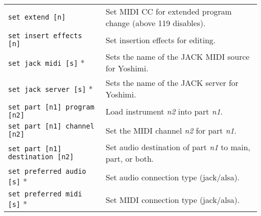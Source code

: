 \begin{table}[H]
\begin{tabular}{l l}
         \texttt{set extend [n]} &
            Set MIDI CC for extended program change (above 119 disables). \\

         \texttt{set insert effects [n]} &
            Set insertion effects for editing. \\

         \texttt{set jack midi [s]} * &
            Sets the name of the JACK MIDI source for Yoshimi. \\

         \texttt{set jack server [s]} * &
            Sets the name of the JACK server for Yoshimi. \\

         \texttt{set part [n1] program [n2]} &
            Load instrument \textsl{n2} into part \textsl{n1}. \\

         \texttt{set part [n1] channel [n2]} &
            Set the MIDI channel \textsl{n2} for part \textsl{n1}. \\

         \texttt{set part [n1] destination [n2]} &
            Set audio destination of part \textsl{n1}
            to main, part, or both. \\

         \texttt{set preferred audio [s]} * &
            Set audio connection type (jack/alsa). \\

         \texttt{set preferred midi [s]} * &
            Set MIDI connection type (jack/alsa). \\

      \end{tabular}
   \end{table}

